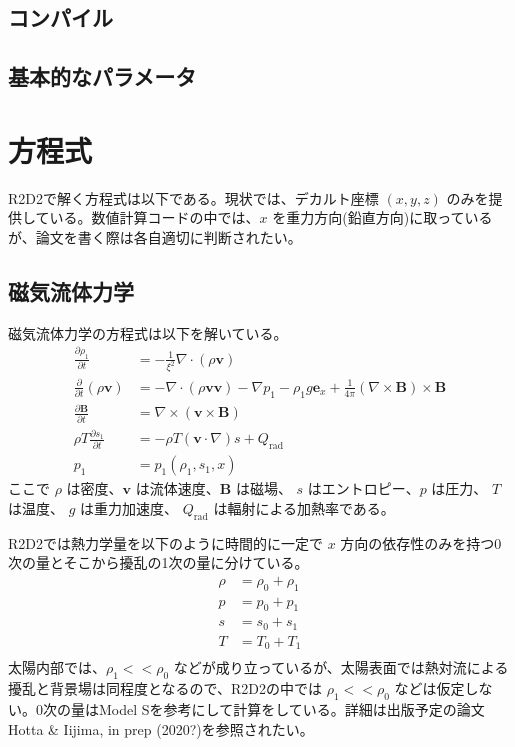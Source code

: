 \documentclass[letterpaper,10pt,dvipdfmx,report]{sphinxmanual}
\begin{document}
\section{コンパイル}
\label{\detokenize{start:id2}}

\section{基本的なパラメータ}
\label{\detokenize{start:id3}}

\chapter{方程式}
\label{\detokenize{equation:id1}}\label{\detokenize{equation::doc}}
R2D2で解く方程式は以下である。現状では、デカルト座標 \((x,y,z)\)  のみを提供している。数値計算コードの中では、\(x\) を重力方向(鉛直方向)に取っているが、論文を書く際は各自適切に判断されたい。


\section{磁気流体力学}
\label{\detokenize{equation:id2}}
磁気流体力学の方程式は以下を解いている。
\begin{equation*}
\begin{split}\frac{\partial \rho_1}{\partial t} &= - \frac{1}{\xi^2}\nabla\cdot
\left(\rho \boldsymbol{v}\right) \\
\frac{\partial}{\partial t}\left(\rho \boldsymbol{v}\right) &=
-\nabla\cdot\left(\rho\boldsymbol{vv}\right)
- \nabla p_1 - \rho_1 g\boldsymbol{e}_x
+\frac{1}{4\pi}\left(\nabla\times\boldsymbol{B}\right)
\times\boldsymbol{B} \\
\frac{\partial \boldsymbol{B}}{\partial t} &=
\nabla\times\left(\boldsymbol{v\times B}\right)
\\
\rho T \frac{\partial s_1}{\partial t} &= -\rho T
\left(\boldsymbol{v}\cdot\nabla\right) s + Q_\mathrm{rad} \\
p_1 &= p_1(\rho_1,s_1,x)\end{split}
\end{equation*}
ここで \(\rho\) は密度、\(\boldsymbol{v}\) は流体速度、\(\boldsymbol{B}\) は磁場、 \(s\) はエントロピー、\(p\) は圧力、 \(T\) は温度、 \(g\) は重力加速度、 \(Q_\mathrm{rad}\) は輻射による加熱率である。

R2D2では熱力学量を以下のように時間的に一定で \(x\) 方向の依存性のみを持つ0次の量とそこから擾乱の1次の量に分けている。
\begin{equation*}
\begin{split}\rho &= \rho_0 + \rho_1 \\
p &= p_0 + p_1 \\
s &= s_0 + s_1 \\
T &= T_0 + T_1 \\\end{split}
\end{equation*}
太陽内部では、\(\rho_1 << \rho_0\) などが成り立っているが、太陽表面では熱対流による擾乱と背景場は同程度となるので、R2D2の中では \(\rho_1 << \rho_0\) などは仮定しない。0次の量はModel Sを参考にして計算をしている。詳細は出版予定の論文Hotta \& Iijima, in prep (2020?)を参照されたい。
\end{document}
